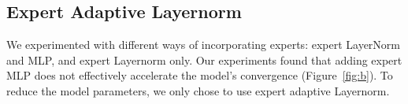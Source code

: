 \subsection{Expert Adaptive Layernorm}
We experimented with different ways of incorporating experts: expert LayerNorm and MLP, and expert Layernorm only. Our experiments found that adding expert MLP does not effectively accelerate the model's convergence (Figure~\ref{fig:b}). To reduce the model parameters, we only chose to use expert adaptive Layernorm.